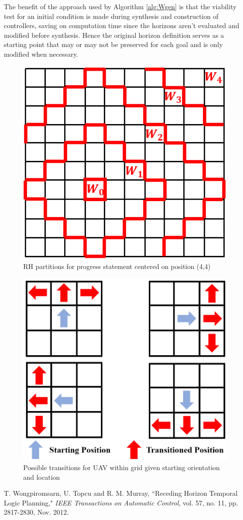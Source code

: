 \documentclass[journal]{IEEEtran}
\begin{document}
The benefit of the approach used by Algorithm \ref{alg:Wgen} is that the viability test for an initial condition is made during synthesis and construction of controllers, saving on computation time since the horizons aren't evaluated and modified before synthesis. Hence the original horizon definition serves as a starting point that may or may not be preserved for each goal and is only modified when necessary.

\begin{figure}
	\includegraphics[width = 0.5 \linewidth]{WPartitionPic}
	\centering
	\caption{RH partitions for progress statement centered on position (4,4)}
	\label{WPart}
	\vspace*{-3mm}
\end{figure}

 \begin{figure}
	\includegraphics[width = 0.6 \linewidth]{Transitions}
	\centering
	\caption{Possible transitions for UAV within grid given starting orientation and location}
	\label{transitions}
	\vspace*{-3mm}
\end{figure}

\begin{thebibliography}{1}
	T. Wongpiromsarn, U. Topcu and R. M. Murray, ``Receding Horizon Temporal Logic Planning," \textit{IEEE Transactions on Automatic Control}, vol. 57, no. 11, pp. 2817-2830, Nov. 2012.	
\end{thebibliography}
\end{document}
